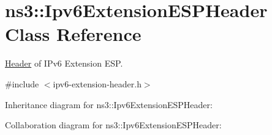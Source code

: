 \hypertarget{classns3_1_1Ipv6ExtensionESPHeader}{}\section{ns3\+:\+:Ipv6\+Extension\+E\+S\+P\+Header Class Reference}
\label{classns3_1_1Ipv6ExtensionESPHeader}


\hyperlink{classns3_1_1Header}{Header} of I\+Pv6 Extension E\+SP.  




{\ttfamily \#include $<$ipv6-\/extension-\/header.\+h$>$}



Inheritance diagram for ns3\+:\+:Ipv6\+Extension\+E\+S\+P\+Header\+:


Collaboration diagram for ns3\+:\+:Ipv6\+Extension\+E\+S\+P\+Header\+:
